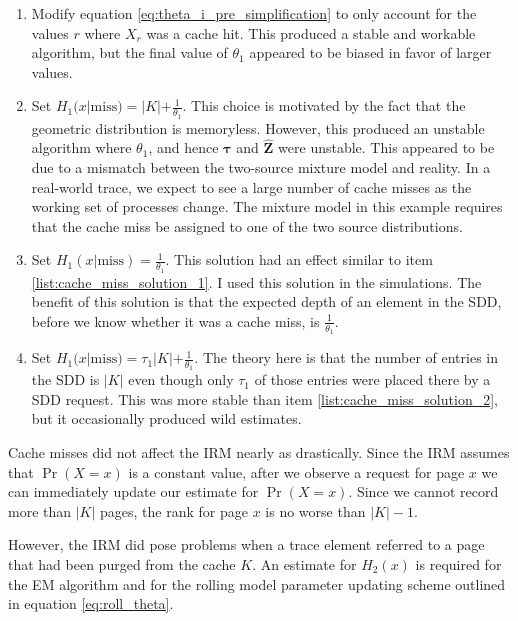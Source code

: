   \begin{enumerate}
  \item
  \label{list:cache_miss_solution_1}
  Modify equation \ref{eq:theta_i_pre_simplification} to only account for
  the values $r$ where $X_r$ was a cache hit. This produced a stable and
  workable algorithm, but the final value of $\theta_1$ appeared to be biased in
  favor of larger values.

  \item
  \label{list:cache_miss_solution_2}
  Set $H_1(x | \mbox{miss}) = |K| + \frac{1}{\theta_1}$. This choice is
  motivated by the fact that the geometric distribution is memoryless. However,
  this produced an unstable algorithm where $\theta_1$, and hence $\bm{\tau}$
  and $\hat{\bm{Z}}$ were unstable. This appeared to be due to a mismatch
  between the two-source mixture model and reality. In a real-world trace, we
  expect to see a large number of cache misses as the working set of processes
  change. The mixture model in this example requires that the cache miss be
  assigned to one of the two source distributions.

  \item
  Set $H_1(x | \mbox{miss}) = \frac{1}{\theta_1}$. This solution had an effect
  similar to item \ref{list:cache_miss_solution_1}. I used this solution in the
  simulations. The benefit of this solution is that the expected depth of an
  element in the SDD, before we know whether it was a cache miss, is
  $\frac{1}{\theta_1}$.

  \item
  Set $H_1(x| \mbox{miss}) = \tau_1 |K| + \frac{1}{\theta_1}$. The theory here
  is that the number of entries in the SDD is $|K|$ even though only $\tau_1$ of
  those entries were placed there by a SDD request. This was more stable than
  item \ref{list:cache_miss_solution_2}, but it occasionally produced wild
  estimates.

  \end{enumerate}

  Cache misses did not affect the IRM nearly as drastically. Since the IRM
  assumes that $\Pr(X = x)$ is a constant value, after we observe a request
  for page $x$ we can immediately update our estimate for $\Pr(X = x)$. Since we
  cannot record more than $|K|$ pages, the rank for page $x$ is no worse than
  $|K| - 1$.

  However, the IRM did pose problems when a trace element referred to a page that
  had been purged from the cache $K$. An estimate for $H_2(x)$ is required for
  the EM algorithm and for the rolling model parameter updating scheme outlined
  in equation \ref{eq:roll_theta}.

